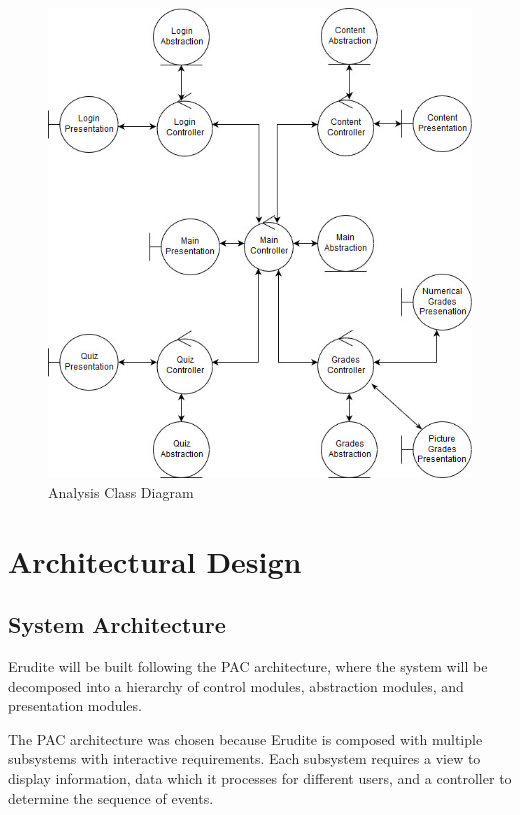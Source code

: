 \documentclass[]{article}
\begin{document}
{
\begin{figure}[h]
  \centering
  \includegraphics[scale=0.5]{A2_Assets/Analysis_Class_Diagrm_v4.jpg}
  \caption{Analysis Class Diagram}
\end{figure}
}


\section{Architectural Design}
\label{sec:architectural_design}

\subsection{System Architecture}
\label{sub:system_architecture}
Erudite will be built following the PAC architecture, where the system will be 
decomposed into a hierarchy of control modules, abstraction modules, and 
presentation modules.

The PAC architecture was chosen because Erudite is composed with multiple 
subsystems with interactive requirements. Each subsystem requires a view to 
display information, data which it processes for different users, and a 
controller to determine the sequence of events.
\end{document}
